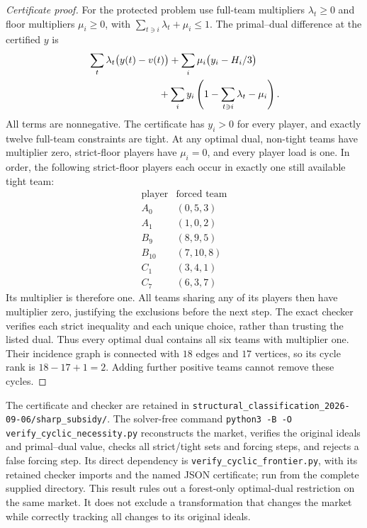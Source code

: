\begin{proof}[Certificate proof]
For the protected problem use full-team multipliers $\lambda_t\ge0$
and floor multipliers $\mu_i\ge0$, with
$\sum_{t\ni i}\lambda_t+\mu_i\le1$. The primal--dual difference
at the certified $y$ is
\begin{align*}
 &\sum_t\lambda_t\bigl(y(t)-v(t)\bigr)
 +\sum_i\mu_i\bigl(y_i-H_i/3\bigr)\\
 &\hspace{25mm}+\sum_i y_i
                  \left(1-\sum_{t\ni i}\lambda_t-\mu_i\right).
\end{align*}
All terms are nonnegative. The certificate has $y_i>0$ for every
player, and exactly twelve full-team constraints are tight. At any
optimal dual, non-tight teams have multiplier zero, strict-floor
players have $\mu_i=0$, and every player load is one. In order, the
following strict-floor players each occur in exactly one still
available tight team:
\[
\begin{array}{c|c}
 \text{player}&\text{forced team}\\ \hline
 A_0&(0,5,3)\\
 A_1&(1,0,2)\\
 B_9&(8,9,5)\\
 B_{10}&(7,10,8)\\
 C_1&(3,4,1)\\
 C_7&(6,3,7)
\end{array}
\]
Its multiplier is therefore one. All teams sharing any of its players
then have multiplier zero, justifying the exclusions before the next
step. The exact checker verifies each strict inequality and each unique
choice, rather than trusting the listed dual. Thus every optimal dual
contains all six teams with multiplier one. Their incidence graph is
connected with $18$ edges and $17$ vertices, so its cycle rank is
$18-17+1=2$. Adding further positive teams cannot remove these cycles.
\end{proof}
The certificate and checker are retained in
\nolinkurl{structural_classification_2026-09-06/sharp_subsidy/}.
The solver-free command
\texttt{python3 -B -O verify\_cyclic\_necessity.py}
reconstructs the market, verifies the original ideals and primal--dual
value, checks all strict/tight sets and forcing steps, and rejects a
false forcing step. Its direct dependency is
\texttt{verify\_cyclic\_frontier.py}, with its retained checker imports
and the named JSON certificate; run from the complete supplied directory.
This result rules out a forest-only optimal-dual restriction on the
same market. It does not exclude a transformation that changes the
market while correctly tracking all changes to its original ideals.

